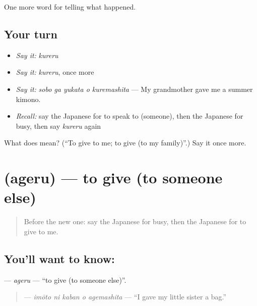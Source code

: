 \begin{grammarlens}[title={What you've built}]
One more word for telling what happened.
\end{grammarlens}

\subsection*{Your turn}
\begin{itemize}
\raggedright
  \item \emph{Say it:} \emph{kureru}
  \item \emph{Say it:} \emph{kureru}, once more
  \item \emph{Say it:} \emph{sobo ga yukata o kuremashita} — My grandmother gave me a summer kimono.
  \item \emph{Recall:} say the Japanese for to speak to (someone), then the Japanese for busy, then say \emph{kureru} again
\end{itemize}

\begin{tcolorbox}[breakable,colback=teal!4,colframe=teal!35!black,title={Before you move on}]
What does  mean? (\textquotedblleft{}To give to me; to give (to my family)\textquotedblright{}.) Say it once more.
\end{tcolorbox}
\section[\texorpdfstring{\ja{あげる} (ageru)}{あげる (ageru)}]{ (ageru) — to give (to someone else)}

\label{lesson:JA-C309-ageru}



\begin{quote}
Before the new one: say the Japanese for busy, then the Japanese for to give to me.
\end{quote}

\subsection*{You'll want to know: }
\textbf{} — \emph{ageru} — \textquotedblleft{}to give (to someone else)\textquotedblright{}.

\begin{quote}
\textbf{  } — \emph{imōto ni kaban o agemashita} — \textquotedblleft{}I gave my little sister a bag.\textquotedblright{}
\end{quote}


